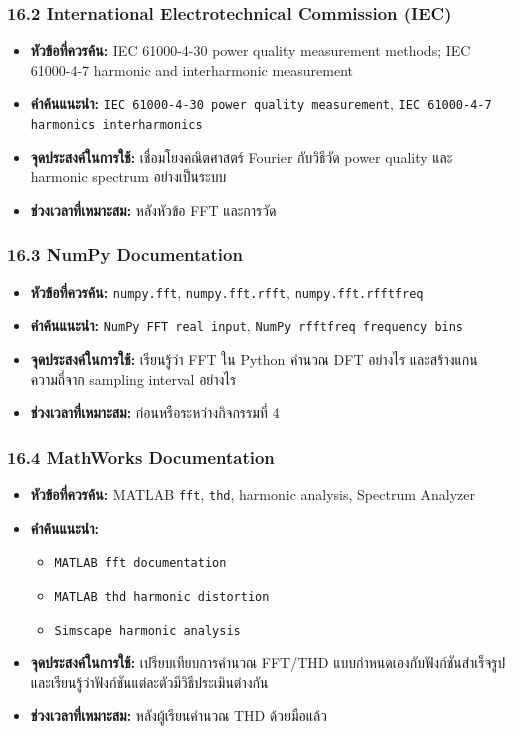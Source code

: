 \subsubsection{16.2 International Electrotechnical Commission (IEC)}

\begin{itemize}
    \item \textbf{หัวข้อที่ควรค้น:} IEC 61000-4-30 power quality measurement methods; IEC 61000-4-7 harmonic and interharmonic measurement
    \item \textbf{คำค้นแนะนำ:} \texttt{IEC 61000-4-30 power quality measurement}, \texttt{IEC 61000-4-7 harmonics interharmonics}
    \item \textbf{จุดประสงค์ในการใช้:} เชื่อมโยงคณิตศาสตร์ Fourier กับวิธีวัด power quality และ harmonic spectrum อย่างเป็นระบบ
    \item \textbf{ช่วงเวลาที่เหมาะสม:} หลังหัวข้อ FFT และการวัด
\end{itemize}

\subsubsection{16.3 NumPy Documentation}

\begin{itemize}
    \item \textbf{หัวข้อที่ควรค้น:} \texttt{numpy.fft}, \texttt{numpy.fft.rfft}, \texttt{numpy.fft.rfftfreq}
    \item \textbf{คำค้นแนะนำ:} \texttt{NumPy FFT real input}, \texttt{NumPy rfftfreq frequency bins}
    \item \textbf{จุดประสงค์ในการใช้:} เรียนรู้ว่า FFT ใน Python คำนวณ DFT อย่างไร และสร้างแกนความถี่จาก sampling interval อย่างไร
    \item \textbf{ช่วงเวลาที่เหมาะสม:} ก่อนหรือระหว่างกิจกรรมที่ 4
\end{itemize}

\subsubsection{16.4 MathWorks Documentation}

\begin{itemize}
    \item \textbf{หัวข้อที่ควรค้น:} MATLAB \texttt{fft}, \texttt{thd}, harmonic analysis, Spectrum Analyzer
    \item \textbf{คำค้นแนะนำ:}
    \begin{itemize}
        \item \texttt{MATLAB fft documentation}
        \item \texttt{MATLAB thd harmonic distortion}
        \item \texttt{Simscape harmonic analysis}
    \end{itemize}
    \item \textbf{จุดประสงค์ในการใช้:} เปรียบเทียบการคำนวณ FFT/THD แบบกำหนดเองกับฟังก์ชันสำเร็จรูป และเรียนรู้ว่าฟังก์ชันแต่ละตัวมีวิธีประเมินต่างกัน
    \item \textbf{ช่วงเวลาที่เหมาะสม:} หลังผู้เรียนคำนวณ THD ด้วยมือแล้ว
\end{itemize}

